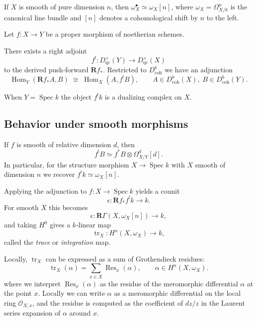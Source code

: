 \documentclass[12pt]{article}
\begin{document}
\begin{example}
If $X$ is smooth of pure dimension $n$, then $\omega_X^\bullet\simeq\omega_X[n]$, where $\omega_X=\Omega^n_{X/k}$ is the canonical line bundle and $[n]$ denotes a cohomological shift by $n$ to the left.
\end{example}

Let $f:X\to Y$ be a proper morphism of noetherian schemes. \begin{theorem}
There exists a right adjoint
\[
f^{!}:D^{+}_{\operatorname{qc}}(Y)\longrightarrow D^{+}_{\operatorname{qc}}(X)
\]
to the derived push‑forward $\mathbf R f_*$.  Restricted to $D^b_{\operatorname{coh}}$ we have an adjunction
\[
\operatorname{Hom}_Y(\mathbf R f_*A,B)\;\cong\;\operatorname{Hom}_X(A,f^{!}B),
\qquad
A\in D^b_{\operatorname{coh}}(X),\;B\in D^b_{\operatorname{coh}}(Y).
\]
\end{theorem}

When $Y=\operatorname{Spec}k$ the object $f^{!}k$ is a dualizing complex on $X$.

\subsection{Behavior under smooth morphisms}
If $f$ is smooth of relative dimension $d$, then
\[
f^{!}B\simeq f^*B\otimes\Omega^d_{X/Y}[d].
\]
In particular, for the structure morphism $X\to\operatorname{Spec}k$ with $X$ smooth of dimension $n$ we recover $f^{!}k\simeq\omega_X[n]$.

Applying the adjunction to $f:X\to\operatorname{Spec}k$ yields a counit
\[
\epsilon:\mathbf R f_*f^{!}k\longrightarrow k.
\]
For smooth $X$ this becomes
\[
\epsilon: \mathbf R\Gamma(X,\omega_X[n])\longrightarrow k,
\]
and taking $H^0$ gives a $k$‑linear map
\[
\operatorname{tr}_X:H^{n}(X,\omega_X)\longrightarrow k,
\]
called the \emph{trace} or \emph{integration} map.

Locally, $\operatorname{tr}_X$ can be expressed as a sum of Grothendieck residues:
\[
\operatorname{tr}_X(\alpha)=\sum_{x\in X}\operatorname{Res}_{x}(\alpha),\qquad\alpha\in H^{n}(X,\omega_X).
\]
where we interpret $\operatorname{Res}_{x}(\alpha)$ as the residue of the meromorphic differential $\alpha$ at the point $x$. Locally we can write $\alpha$ as a meromorphic differential on the local ring $\mathcal{O}_{X,x}$, and the residue is computed as the coefficient of $dz/z$ in the Laurent series expansion of $\alpha$ around $x$.
\end{document}
